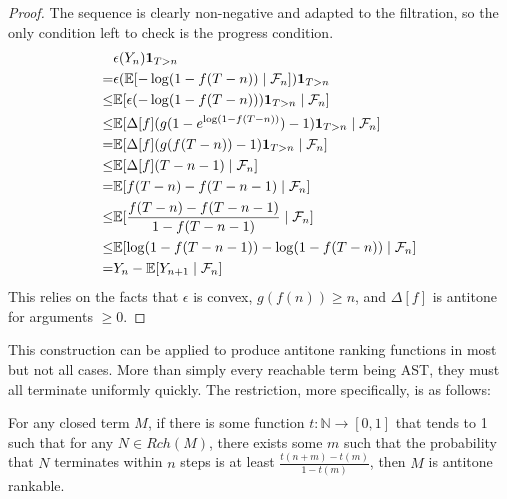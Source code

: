 \begin{proof}
The sequence is clearly non-negative and adapted to the filtration, so the only condition left to check is the progress condition.
\begin{align*}
& \epsilon(Y_n) \mathbf 1_{T > n} \\
= & \epsilon(\mathbb E[-\log(1-f(T-n)) \mid \mathcal{F}_n]) \mathbf 1_{T > n} \\
\leq & \mathbb E[\epsilon(-\log(1-f(T-n))) \mathbf 1_{T > n} \mid \mathcal{F}_n] \\
\leq & \mathbb E[\Delta[f](g(1-e^{\log(1-f(T-n))})-1) \mathbf 1_{T > n} \mid \mathcal{F}_n] \\
= & \mathbb E[\Delta[f](g(f(T-n))-1) \mathbf 1_{T > n} \mid \mathcal{F}_n] \\
\leq & \mathbb E[\Delta[f](T-n-1) \mid \mathcal{F}_n] \\
= & \mathbb E[f(T-n)-f(T-n-1) \mid \mathcal{F}_n] \\
\leq & \mathbb E[\frac{f(T-n)-f(T-n-1)}{1-f(T-n-1)} \mid \mathcal{F}_n] \\
\leq & \mathbb E[\log(1-f(T-n-1)) - \log(1-f(T-n)) \mid \mathcal{F}_n] \\
= & Y_n - \mathbb E[Y_{n+1} \mid \mathcal{F}_n]
\end{align*}
This relies on the facts that $\epsilon$ is convex, $g(f(n)) \geq n$, and $\Delta[f]$ is antitone for arguments $\geq 0$.

\end{proof}

This construction can be applied to produce antitone ranking functions in most but not all cases. More than simply every reachable term being AST, they must all terminate uniformly quickly. The restriction, more specifically, is as follows:

\begin{therm}
\label{thm:towards completeness}
For any closed term $M$, if there is some function $t : \mathbb N \to [0,1]$ that tends to 1 such that for any $N \in \mathit{Rch}(M)$, there exists some $m$ such that the probability that $N$ terminates within $n$ steps is at least $\frac{t(n+m)-t(m)}{1-t(m)}$, then $M$ is antitone rankable.
\end{therm}

